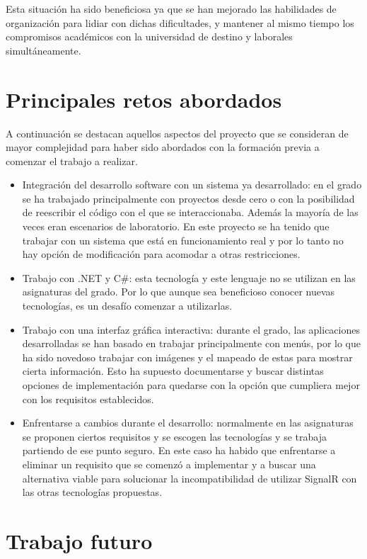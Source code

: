 Esta situación ha sido beneficiosa ya que se han mejorado las habilidades de organización para lidiar con dichas dificultades, y mantener al mismo tiempo los compromisos académicos con la universidad de destino y laborales simultáneamente.

\section{Principales retos abordados}

A continuación se destacan aquellos aspectos del proyecto que se consideran de mayor complejidad para haber sido abordados con la formación previa a comenzar el trabajo a realizar. 
\begin{itemize}
    \item Integración del desarrollo software con un sistema ya desarrollado: en el grado se ha trabajado principalmente con proyectos desde cero o con la posibilidad de reescribir el código con el que se interaccionaba. Además la mayoría de las veces eran escenarios de laboratorio. En este proyecto se ha tenido que trabajar con un sistema que está en funcionamiento real y por lo tanto no hay opción de modificación para acomodar a otras restricciones.
    \item Trabajo con .NET y C\#: esta tecnología y este lenguaje no se utilizan en las asignaturas del grado. Por lo que aunque sea beneficioso conocer nuevas tecnologías, es un desafío comenzar a utilizarlas.
    \item Trabajo con una interfaz gráfica interactiva: durante el grado, las aplicaciones desarrolladas se han basado en trabajar principalmente con menús, por lo que ha sido novedoso trabajar con imágenes y el mapeado de estas para mostrar cierta información. Esto ha supuesto documentarse y buscar distintas opciones de implementación para quedarse con la opción que cumpliera mejor con los requisitos establecidos.
    \item Enfrentarse a cambios durante el desarrollo: normalmente en las asignaturas se proponen ciertos requisitos y se escogen las tecnologías y se trabaja partiendo de ese punto seguro. En este caso ha habido que enfrentarse a eliminar un requisito que se comenzó a implementar y a buscar una alternativa viable para solucionar la incompatibilidad de utilizar SignalR con las otras tecnologías propuestas.
\end{itemize}


\section{Trabajo futuro}
\label{section-trabajo-futuro}

